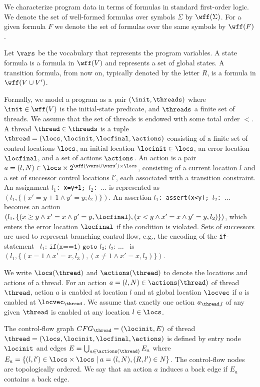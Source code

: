 \documentclass[conference]{IEEEtran}
\begin{document}
We characterize program data in terms of formulas in standard first-order
logic.  We denote the set of well-formed formulas over symbols $\Sigma$ by
$\wff(\Sigma)$.  For a given formula $F$ we denote the set of formulas over
the same symbols by $\wff(F)$.  

Let $\vars$ be the vocabulary that represents the program variables.
A state formula is a formula in $\wff(V)$ and represents a set of global states.  
A transition formula, from now on, typically denoted by the letter
$R$, is a formula in $\wff(V\cup V')$.

Formally, we model a program  as a pair $(\init,\threads)$ where $\init \in
\wff(V)$ is the initial-state predicate, and $\threads$ a finite set of
threads.  We assume that the set of threads is endowed with some total order
$<$.  A thread $\thread \in \threads$ is a tuple
$\thread=(\locs,\locinit,\locfinal,\actions)$ consisting of a finite set of
control locations $\locs$, an initial location $\locinit \in \locs$, an
error location $\locfinal$, and a set of actions $\actions$.  An action is a
pair $a=(l,N) \in \locs \times 2^{\wff(\vars \cup \vars') \times \locs}$,
consisting of a current location $l$ and a set of successor control
locations $l'$, each associated with a transition constraint. 
An assignment \mbox{\texttt{$l_1$: x=y+1; $l_2$: $\ldots$}} 
is represented as \mbox{$(l_1,\{(x'=y+1\wedge y'=y;l_2)\})$}.
An assertion \mbox{\texttt{$l_1$: assert(x<y); $l_2$: $\ldots$}} becomes an action
$(l_1,\{(x\geq y\wedge x'=x \wedge y'=y,\locfinal),(x<y\wedge x'=x \wedge y'=y,l_2)\})$,
which enters the error location $\locfinal$ if the condition is violated.
Sets of successors are used to represent branching control flow, e.g., the encoding
of the \texttt{if}-statement
\mbox{
$
\texttt{$l_1$: if(x==1) goto $l_3$; $l_2$: $\ldots$}
$
}
is \mbox{$(l_1,\{(x=1\wedge x'=x,l_3),(x\neq1\wedge x'=x,l_2)\})$}. 


We write $\locs(\thread)$ and $\actions(\thread)$ to
denote the locations and actions of a thread.  For an action $a=(l,N)\in
\actions(\thread)$ of thread $\thread$, action $a$ is enabled at location
$l$ and at global location $\locvec$ if $a$ is enabled at $\locvec_\thread$. 
We assume that exactly one action $a_{\thread,l}$ of any given $\thread$ is
enabled at any location $l\in\locs$.

The control-flow graph $CFG_\thread=(\locinit,E)$ of thread
$\thread=(\locs,\locinit,\locfinal,\actions)$ is defined by entry node
$\locinit$ and edges $E=\bigcup_{a\in\actions(\thread)} E_a$ where
$E_a=\{(l,l')\in \locs\times\locs \mid a=(l,N), (R,l')\in N\}$.  The
control-flow nodes are topologically ordered.  We say that an action $a$
induces a back edge if $E_a$ contains a back edge.
\end{document}
